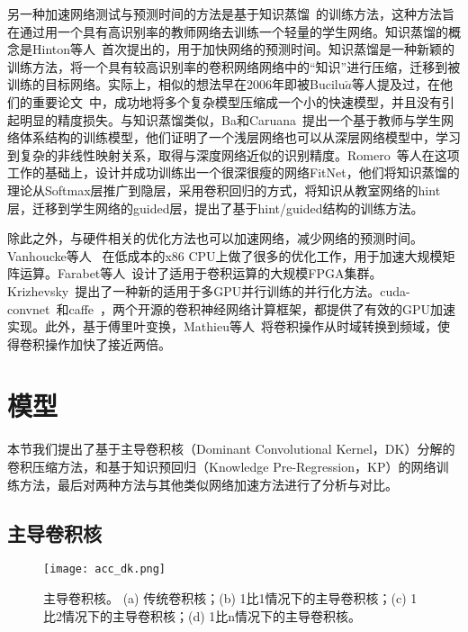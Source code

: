 另一种加速网络测试与预测时间的方法是基于知识蒸馏~\cite{hinton2015distilling}的训练方法，这种方法旨在通过用一个具有高识别率的教师网络去训练一个轻量的学生网络。知识蒸馏的概念是Hinton等人~\cite{hinton2015distilling}首次提出的，用于加快网络的预测时间。知识蒸馏是一种新颖的训练方法，将一个具有较高识别率的卷积网络网络中的“知识”进行压缩，迁移到被训练的目标网络。实际上，相似的想法早在2006年即被Bucilu$\check{a}$等人提及过，在他们的重要论文~\cite{bucilu2006model}中，成功地将多个复杂模型压缩成一个小的快速模型，并且没有引起明显的精度损失。与知识蒸馏类似，Ba和Caruana~\cite{ba2014deep}提出一个基于教师与学生网络体系结构的训练模型，他们证明了一个浅层网络也可以从深层网络模型中，学习到复杂的非线性映射关系，取得与深度网络近似的识别精度。Romero~\cite{romero2014fitnets}等人在这项工作的基础上，设计并成功训练出一个很深很瘦的网络FitNet，他们将知识蒸馏的理论从Softmax层推广到隐层，采用卷积回归的方式，将知识从教室网络的hint层，迁移到学生网络的guided层，提出了基于hint/guided结构的训练方法。

除此之外，与硬件相关的优化方法也可以加速网络，减少网络的预测时间。Vanhoucke等人~\cite{vanhoucke2011improving} 在低成本的x86 CPU上做了很多的优化工作，用于加速大规模矩阵运算。Farabet等人~\cite{farabet2011large}设计了适用于卷积运算的大规模FPGA集群。Krizhevsky~\cite{krizhevsky2014one}提出了一种新的适用于多GPU并行训练的并行化方法。cuda-convnet~\cite{krizhevsky2012imagenet}和caffe~\cite{jia2014caffe}，两个开源的卷积神经网络计算框架，都提供了有效的GPU加速实现。此外，基于傅里叶变换，Mathieu等人~\cite{mathieu2013fast}将卷积操作从时域转换到频域，使得卷积操作加快了接近两倍。

\section{模型}
\label{sec:acc:model}

本节我们提出了基于主导卷积核（Dominant Convolutional Kernel，DK）分解的卷积压缩方法，和基于知识预回归（Knowledge Pre-Regression，KP）的网络训练方法，最后对两种方法与其他类似网络加速方法进行了分析与对比。

\subsection{主导卷积核}
\label{sec:acc:model:dk}

\begin{figure}
\centering
\texttt{[image: acc\_dk.png]}
\caption{主导卷积核。 (a) 传统卷积核；(b) 1比1情况下的主导卷积核；(c) 1比2情况下的主导卷积核；(d) 1比n情况下的主导卷积核。}
\label{fig:acc_dk}
\end{figure} 

